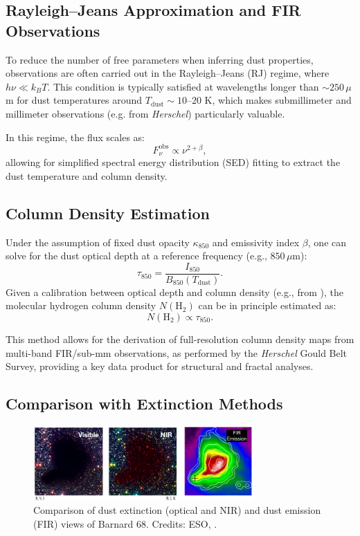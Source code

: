 \subsection{Rayleigh–Jeans Approximation and FIR Observations}

To reduce the number of free parameters when inferring dust properties, observations are often carried out in the Rayleigh–Jeans (RJ) regime, where $h\nu \ll k_B T$. This condition is typically satisfied at wavelengths longer than $\sim 250\,\mu$m for dust temperatures around $T_\mathrm{dust} \sim 10$–$20$ K, which makes submillimeter and millimeter observations (e.g. from \textit{Herschel}) particularly valuable.

In this regime, the flux scales as:
\[
F_\nu^{\mathrm{obs}} \propto \nu^{2+\beta},
\]
allowing for simplified spectral energy distribution (SED) fitting to extract the dust temperature and column density.

\subsection{Column Density Estimation}

Under the assumption of fixed dust opacity $\kappa_{850}$ and emissivity index $\beta$, one can solve for the dust optical depth at a reference frequency (e.g., $850\,\mu$m):
\[
\tau_{850} = \frac{I_{850}}{B_{850}(T_\mathrm{dust})}.
\]
Given a calibration between optical depth and column density (e.g., from \cite{hildebrand1983determination}), the molecular hydrogen column density $N(\mathrm{H}_2)$ can be in principle estimated as:
\[
N(\mathrm{H}_2) \propto \tau_{850}.
\]

This method allows for the derivation of full-resolution column density maps from multi-band FIR/sub-mm observations, as performed by the \textit{Herschel} Gould Belt Survey, providing a key data product for structural and fractal analyses.

\subsection{Comparison with Extinction Methods}

\begin{figure}[t]
    \centering
    \includegraphics[width=0.75\textwidth]{figures/comparison_dust.png}
    \caption{Comparison of dust extinction (optical and NIR) and dust emission (FIR) views of Barnard 68. Credits: ESO, \cite{nielbock2012earliest}.}
    \label{fig:comparison_dust}
\end{figure}

